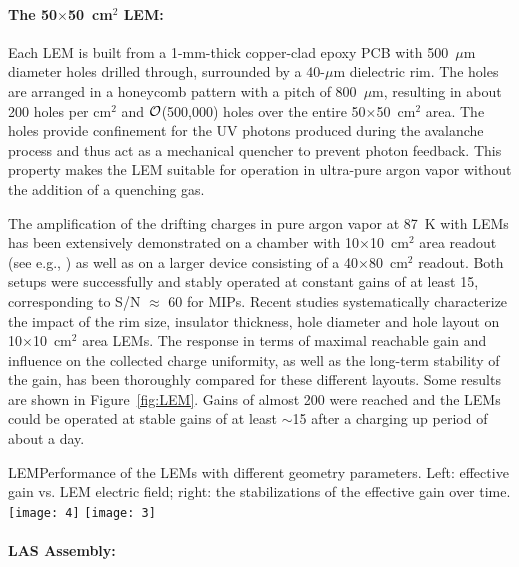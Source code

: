 \paragraph{The 50$\times$50~cm$^2$ LEM:}

Each LEM is built from a 1-mm-thick copper-clad epoxy PCB with
500~$\mu$m diameter holes drilled through, surrounded by a
40-$\mu$m dielectric rim. The holes are arranged in a honeycomb
pattern with a pitch of 800~$\mu$m, resulting in about 200 holes per
cm$^2$ and $\cal O$(500,000) holes over the entire 50$\times$50~cm$^2$
area. The holes provide confinement for the UV photons produced during
the avalanche process and thus act as a mechanical quencher to prevent
photon feedback. This property makes the LEM suitable for operation in
ultra-pure argon vapor without the addition of a quenching gas. 

The amplification of the drifting charges in pure argon vapor at 87~K with
LEMs has been extensively demonstrated on a chamber with
10$\times$10~cm$^2$ area readout (see e.g.,
\cite{Badertscher:2008rf,Badertscher:2010fi}) as well as on
a larger device consisting of a 40$\times$80~cm$^2$
readout\cite{Badertscher:2013wm}.  Both setups were successfully and
stably operated at constant gains of at least 15, corresponding to
S/N $\approx$ 60 for MIPs. Recent studies\cite{Cantini:2014xza}
systematically characterize the impact of the rim size, insulator
thickness, hole diameter and hole layout on 10$\times$10~cm$^2$ area
LEMs. The response in terms of maximal reachable gain and influence on
the collected charge uniformity, as well as the long-term stability of
the gain, has been thoroughly compared for these different
layouts. Some results are shown in Figure~\ref{fig:LEM}.  Gains of
almost 200 were reached and the LEMs could be operated at stable gains
of at least $\sim$15 after a charging up period of about a day.
\begin{cdrfigure}{LEM}{Performance of the LEMs with different geometry parameters. Left: effective gain vs. LEM electric field; right: the stabilizations of the effective gain over time.}
\texttt{[image: 4]}
\texttt{[image: 3]}
\end{cdrfigure}


\paragraph{LAS Assembly:}

